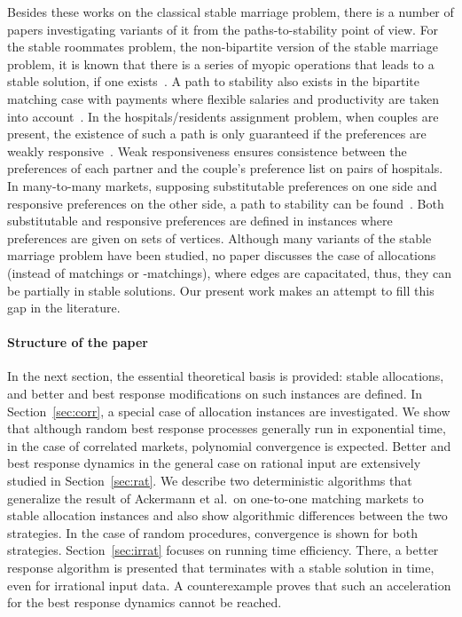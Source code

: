 \documentclass{llncs}
\begin{document}
Besides these works on the classical stable marriage problem, there is a number of papers investigating variants of it from the paths-to-stability point of view. For the stable roommates problem, the non-bipartite version of the stable marriage problem, it is known that there is a series of myopic operations that leads to a stable solution, if one exists~\cite{Diamantoudi200418}. A path to stability also exists in the bipartite matching case with payments where flexible salaries and productivity are taken into account~\cite{chen_decentr}. In the hospitals/residents assignment problem, when couples are present, the existence of such a path is only guaranteed if the preferences are weakly responsive~\cite{klaus_pts}. Weak responsiveness ensures consistence between the preferences of each partner and the couple's preference list on pairs of hospitals. In many-to-many markets, supposing substitutable preferences on one side and responsive preferences on the other side, a path to stability can be found~\cite{unver_kojima}. Both substitutable and responsive preferences are defined in instances where preferences are given on sets of vertices. Although many variants of the stable marriage problem have been studied, no paper discusses the case of allocations (instead of matchings or -matchings), where edges are capacitated, thus, they can be partially in stable solutions. Our present work makes an attempt to fill this gap in the literature.

\paragraph{Structure of the paper} In the next section, the essential theoretical basis is provided: stable allocations, and better and best response modifications on such instances are defined. In Section~\ref{sec:corr}, a special case of allocation instances are investigated. We show that although random best response processes generally run in exponential time, in the case of correlated markets, polynomial convergence is expected. Better and best response dynamics in the general case on rational input are extensively studied in Section~\ref{sec:rat}. We describe two deterministic algorithms that generalize the result of Ackermann et al.\ on one-to-one matching markets to stable allocation instances and also show algorithmic differences between the two strategies. In the case of random procedures, convergence is shown for both strategies. Section~\ref{sec:irrat} focuses on running time efficiency. There, a better response algorithm is presented that terminates with a stable solution in  time, even for irrational input data. A counterexample proves that such an acceleration for the best response dynamics cannot be reached. 
\end{document}
